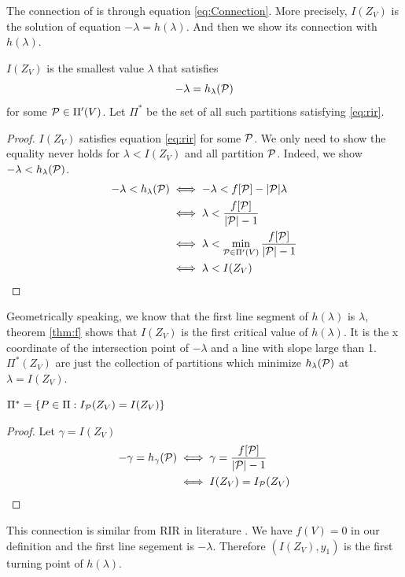 \documentclass{article}
\begin{document}
The connection of  is through equation \eqref{eq:Connection}. More precisely, $I(Z_V)$
is the solution of equation $-\lambda = h(\lambda)$.
And then we show its connection with $h(\lambda)$.
\begin{theorem}\label{thm:f}
$I(Z_V)$ is the smallest value $\lambda$ that satisfies
\begin{equation}\label{eq:rir}
-\lambda = h_{\lambda}(\P)
\end{equation}
for some $\P \in \Pi'(V)$. Let $\Pi^*$ be the set of all such partitions satisfying \eqref{eq:rir}.
\end{theorem}
\begin{proof}
$I(Z_V)$ satisfies equation \eqref{eq:rir} for some $\P$. We only need to show the equality never holds for $\lambda < I(Z_V)$ and all partition $\P$. Indeed, we show $-\lambda < h_{\lambda}(\P)$.
\begin{align*}
-\lambda < h_{\lambda}(\P) &\iff -\lambda < f[\P] - \abs{\P} \lambda \\
& \iff \lambda < { f[\P] \over \abs{\P} - 1 } \\
& \iff \lambda < \min_{\P \in \Pi'(V)} { f[\P] \over \abs{\P} - 1 } \\
& \iff \lambda < I(Z_V)
\end{align*}
\end{proof}
\begin{remark}
Geometrically speaking, we know that the first line segment of $h(\lambda)$ is $\lambda$, theorem \ref{thm:f} shows that $I(Z_V)$ is the first critical value of $h(\lambda)$. It is the x coordinate of the intersection point of $-\lambda$ and a line with slope large than 1. $\Pi^*(Z_V) $ are just the collection of partitions which minimize $h_{\lambda}(\P)$ at $\lambda = I(Z_V)$.
\end{remark}

\begin{corollary}\label{cor:F}
$\Pi^*= \{ P \in \Pi: I_{\P}(Z_V) = I(Z_V)\}$
\end{corollary}
\begin{proof}
Let $\gamma = I(Z_V)$
\begin{align*}
-\gamma = h_{\gamma}(\P) & \iff  \gamma = { f[\P] \over \abs{\P} - 1 } \\
& \iff I(Z_V) = I_{\P}(Z_V)
\end{align*}
\end{proof}
This connection is similar from RIR in literature \cite{ic}. We have $f(V)=0$ in our definition and the first line segement is $-\lambda$. Therefore
$(I(Z_V),  y_1)$ is the first turning point of $h(\lambda)$.
\end{document}

